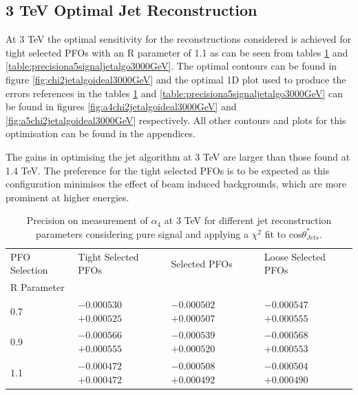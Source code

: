 \subsection{3 TeV Optimal Jet Reconstruction}
At 3 TeV the optimal sensitivity for the reconstructions considered is achieved for tight selected PFOs with an R parameter of 1.1 as can be seen from tables \ref{table:precisiona4signaljetalgo3000GeV} and \ref{table:precisiona5signaljetalgo3000GeV}.  The optimal contours can be found in figure \ref{fig:chi2jetalgoideal3000GeV} and the optimal 1D plot used to produce the errors references in the tables \ref{table:precisiona4signaljetalgo3000GeV} and \ref{table:precisiona5signaljetalgo3000GeV} can be found in figures \ref{fig:a4chi2jetalgoideal3000GeV} and \ref{fig:a5chi2jetalgoideal3000GeV} respectively.  All other contours and plots for this optimisation can be found in the appendices.  

The gains in optimising the jet algorithm at 3 TeV are larger than those found at 1.4 TeV.  The preference for the tight selected PFOs is to be expected as this configuration minimises the effect of beam induced backgrounds, which are more prominent at higher energies.  

\begin{table}[h!]
\centering
\begin{tabular}{l l l l}
\hline
PFO Selection & Tight Selected PFOs & Selected PFOs & Loose Selected PFOs \\ 
R Parameter & & & \\ 
\hline
0.7 & $-0.000530$ $+0.000525$ & $-0.000502$ $+0.000507$ & $-0.000547$ $+0.000555$ \\
0.9 & $-0.000566$ $+0.000555$ & $-0.000539$ $+0.000520$ & $-0.000568$ $+0.000553$ \\
1.1 & $-0.000472$ $+0.000472$ & $-0.000508$ $+0.000492$ & $-0.000504$ $+0.000490$ \\
\hline
\end{tabular}
\caption[$1\sigma$ precision on measurement of $\alpha_{4}$ for different jet reconstruction parameters considering pure signal at 3 TeV.]{Precision on measurement of $\alpha_{4}$ at 3 TeV for different jet reconstruction parameters considering pure signal and applying a $\chi^{2}$ fit to $\text{cos}\theta^{*}_{Jets}$.}
\label{table:precisiona4signaljetalgo3000GeV}
\end{table}

